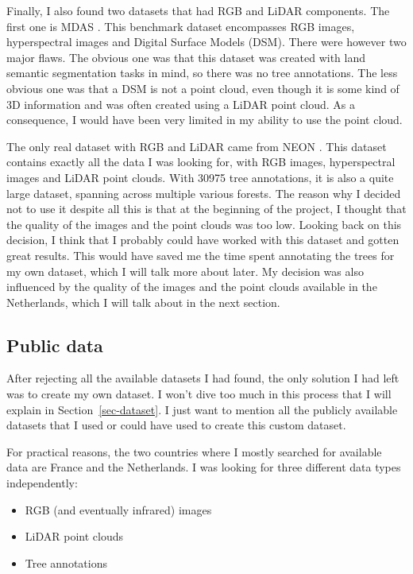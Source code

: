 \documentclass[
]{report}
\providecommand{\tightlist}{%
  \setlength{\itemsep}{0pt}\setlength{\parskip}{0pt}}\usepackage{longtable,booktabs,array}
\begin{document}
Finally, I also found two datasets that had RGB and LiDAR components.
The first one is MDAS \autocite{MDAS}. This benchmark dataset
encompasses RGB images, hyperspectral images and Digital Surface Models
(DSM). There were however two major flaws. The obvious one was that this
dataset was created with land semantic segmentation tasks in mind, so
there was no tree annotations. The less obvious one was that a DSM is
not a point cloud, even though it is some kind of 3D information and was
often created using a LiDAR point cloud. As a consequence, I would have
been very limited in my ability to use the point cloud.

The only real dataset with RGB and LiDAR came from NEON
\autocite{NEONdata}. This dataset contains exactly all the data I was
looking for, with RGB images, hyperspectral images and LiDAR point
clouds. With 30975 tree annotations, it is also a quite large dataset,
spanning across multiple various forests. The reason why I decided not
to use it despite all this is that at the beginning of the project, I
thought that the quality of the images and the point clouds was too low.
Looking back on this decision, I think that I probably could have worked
with this dataset and gotten great results. This would have saved me the
time spent annotating the trees for my own dataset, which I will talk
more about later. My decision was also influenced by the quality of the
images and the point clouds available in the Netherlands, which I will
talk about in the next section.

\subsection{Public data}\label{public-data}

After rejecting all the available datasets I had found, the only
solution I had left was to create my own dataset. I won't dive too much
in this process that I will explain in Section~\ref{sec-dataset}. I just
want to mention all the publicly available datasets that I used or could
have used to create this custom dataset.

For practical reasons, the two countries where I mostly searched for
available data are France and the Netherlands. I was looking for three
different data types independently:

\begin{itemize}
\tightlist
\item
  RGB (and eventually infrared) images
\item
  LiDAR point clouds
\item
  Tree annotations
\end{itemize}
\end{document}
